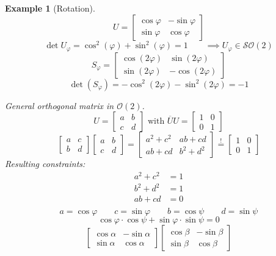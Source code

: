 \documentclass{article}
\newtheorem{example}{Example}  \numberwithin{example}{section}
\begin{document}
\begin{example}[Rotation]
  \[ U = \begin{bmatrix} \cos{\varphi} & -\sin{\varphi} \\ \sin{\varphi} & \cos{\varphi} \end{bmatrix} \]
  \[ \det{U_{\varphi}} = \cos^2(\varphi) + \sin^2(\varphi) = 1 \qquad \implies U_{\varphi} \in \mathcal {SO}(2) \]
  \[ S_{\varphi} = \begin{bmatrix} \cos(2\varphi) & \sin(2\varphi) \\ \sin(2\varphi) & -\cos(2\varphi) \end{bmatrix} \]
  \[ \det(S_{\varphi}) = -\cos^2(2\varphi) - \sin^2(2\varphi) = -1 \]

  General orthogonal matrix in $\mathcal O(2)$.
  \[ U = \begin{bmatrix} a & b \\ c & d \end{bmatrix} \text{ with } \overline U U = \begin{bmatrix} 1 & 0 \\ 0 & 1 \end{bmatrix} \]
  \[
    \begin{bmatrix} a & c \\ b & d \end{bmatrix} \begin{bmatrix} a & b \\ c & d \end{bmatrix}
    = \begin{bmatrix} a^2 + c^2 & ab + cd \\ ab + cd & b^2 + d^2 \end{bmatrix}
    \overset!= \begin{bmatrix} 1 & 0 \\ 0 & 1 \end{bmatrix}
  \]
  Resulting constraints:
  \begin{align}
    a^2 + c^2 &= 1 \\
    b^2 + d^2 &= 1 \\
    ab + cd &= 0 \\
  \end{align}
  \[ a = \cos\varphi \qquad c = \sin\varphi \qquad b = \cos\psi \qquad d = \sin\psi \]
  \[ \cos\varphi \cdot \cos\psi + \sin\varphi \cdot \sin\psi = 0 \]
  \[
    \begin{bmatrix} \cos\alpha & -\sin\alpha \\ \sin\alpha & \cos\alpha \end{bmatrix}
    \begin{bmatrix} \cos\beta & -\sin\beta \\ \sin\beta & \cos\beta \end{bmatrix}
\]
\end{example}
\end{document}
